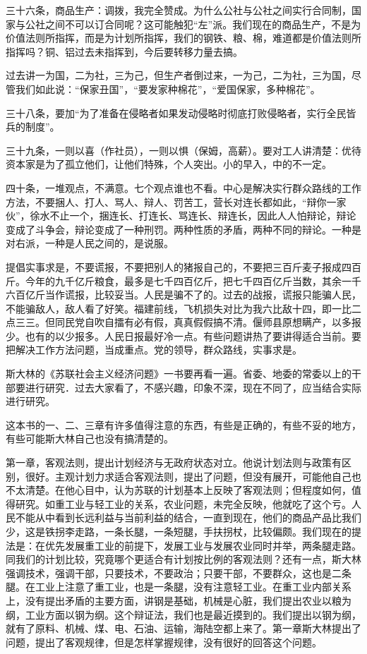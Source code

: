 三十六条，商品生产：调拨，我完全赞成。为什么公社与公社之间实行合同制，国家与公社之间不可以订合同呢？这可能触犯“左”派。我们现在的商品生产，不是为价值法则所指挥，而是为计划所指挥，我们的钢铁、粮、棉，难道都是价值法则所指挥吗？铜、铝过去未指挥到，今后要转移力量去搞。

过去讲一为国，二为社，三为己，但生产者倒过来，一为己，二为社，三为国，尽管我们如此说：“保家丑国”，“要发家种棉花”，“爱国保家，多种棉花”。

三十八条，要加“为了准备在侵略者如果发动侵略时彻底打败侵略者，实行全民皆兵的制度”。

三十九条，一则以喜（作社员），一则以惧（保姆，高薪）。要对工人讲清楚：优待资本家是为了孤立他们，让他们特殊，个人突出。小的早入，中的不一定。

四十条，一堆观点，不满意。七个观点谁也不看。中心是解决实行群众路线的工作方法，不要捆人、打人、骂人、辩人、罚苦工，营长对连长都如此，“辩你一家伙”，徐水不止一个，捆连长、打连长、骂连长、辩连长，因此人人怕辩论，辩论变成了斗争会，辩论变成了一种刑罚。两种性质的矛盾，两种不同的辩论。一种是对右派，一种是人民之间的，是说服。

提倡实事求是，不要谎报，不要把别人的猪报自己的，不要把三百斤麦子报成四百斤。今年的九千亿斤粮食，最多是七千四百亿斤，把七千四百亿斤当数，其余一千六百亿斤当作谎报，比较妥当。人民是骗不了的。过去的战报，谎报只能骗人民，不能骗敌人，敌人看了好笑。福建前线，飞机损失对比为我六比敌十四，即一比二点三三。但同民党自吹自擂有必有假，真真假假搞不清。偃师县原想瞒产，以多报少。也有的以少报多。人民日报最好冷一点。有些问题讲热了要讲得适合当前。要把解决工作方法问题，当成重点。党的领导，群众路线，实事求是。

斯大林的《苏联社会主义经济问题》一书要再看一遍。省委、地委的常委以上的干部要进行研究．过去大家看了，不感兴趣，印象不深，现在不同了，应当结合实际进行研究。

这本书的一、二、三章有许多值得注意的东西，有些是正确的，有些不妥的地方，有些可能斯大林自己也没有搞清楚的。

第一章，客观法则，提出计划经济与无政府状态对立。他说计划法则与政策有区别，很好。主观计划力求适合客观法则，提出了问题，但没有展开，可能他自己也不太清楚。在他心目中，认为苏联的计划基本上反映了客观法则；但程度如何，值得研究。如重工业与轻工业的关系，农业问题，未完全反映，他就吃了这个亏。人民不能从中看到长远利益与当前利益的结合，一直到现在，他们的商品产品比我们少，这是铁拐李走路，一条长腿，一条短腿，手扶拐杖，比较偏颇。我们现在的提法是：在优先发展重工业的前提下，发展工业与发展农业同时并举，两条腿走路。同我们的计划比较，究竟哪个更适合有计划按比例的客观法则？还有一点，斯大林强调技术，强调干部，只要技术，不要政治；只要干部，不要群众，这也是二条腿。在工业上注意了重工业，也是一条腿，没有注意轻工业。在重工业内部关系上，没有提出矛盾的主要方面，讲钢是基础，机械是心脏，我们提出农业以粮为纲，工业方面以钢为纲。这个辩证法，我们也是最近摸到的。我们提出以钢为纲，就有了原料、机械、煤、电、石油、运输，海陆空都上来了。第一章斯大林提出了问题，提出了客观规律，但是怎样掌握规律，没有很好的回答这个问题。

